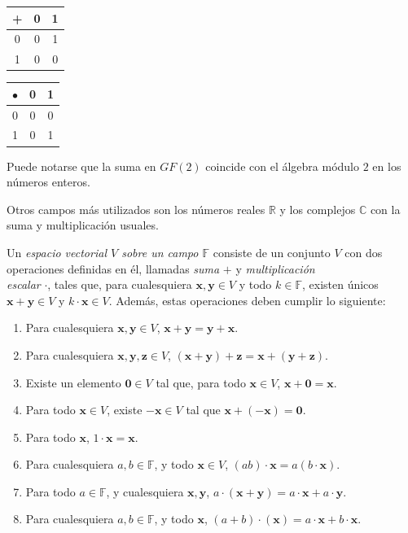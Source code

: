             \begin{center}
                \begin{tabular}{ c | c c }
                    + & 0 & 1 \\ \hline
                    0 & 0 & 1 \\  
                    1 & 0 & 0    
                \end{tabular}
            \end{center}

            \begin{center}
                \begin{tabular}{ c | c c }
                    $\bullet$ & 0 & 1 \\ \hline
                    0 & 0 & 0 \\  
                    1 & 0 & 1    
                \end{tabular}
            \end{center}

            Puede notarse que la suma en $GF(2)$ coincide con el álgebra módulo $2$ en los números enteros.

            Otros campos más utilizados son los números reales $\mathbb{R}$ y los complejos $\mathbb{C}$ con la suma y multiplicación usuales.


            Un \textit{espacio vectorial $V$ sobre un campo $\mathbb{F}$} consiste de un conjunto $V$ con dos operaciones definidas en él, llamadas  \textit{suma} $+$ y \textit{multiplicación \\ escalar} $\cdot$, tales que, para cualesquiera $\mathbf{x,y} \in V$ y todo $k \in \mathbb{F}$, existen únicos $\mathbf{x + y} \in V$ y $k \cdot \mathbf{x} \in V$. Además, estas operaciones deben cumplir lo siguiente:
 
            \begin{enumerate}
                \item Para cualesquiera $\mathbf{x,y} \in V$, $\mathbf{x + y = y + x}$.
                \item Para cualesquiera $\mathbf{x,y,z} \in V$, $\mathbf{(x+y)+z = x+ (y+z)}$.
                \item Existe un elemento $\mathbf{0} \in V$ tal que, para todo $\mathbf{x} \in V$, $\mathbf{x + 0 = x}$.
                \item Para todo $\mathbf{x} \in V$, existe $\mathbf{-x} \in V$ tal que $\mathbf{x + (-x) = 0}$.
                \item Para todo $\mathbf{x}$, $1 \cdot \mathbf{x} = \mathbf{x}$.
                \item Para cualesquiera $a,b \in \mathbb{F}$, y todo $\mathbf{x} \in V$, $(ab)\cdot \mathbf{x} = a(b\cdot\mathbf{x})$.
                \item Para todo $a \in \mathbb{F}$, y cualesquiera $\mathbf{x,y}$, $a \cdot (\mathbf{x + y}) = a\cdot \mathbf{x} + a\cdot \mathbf{y}$.
                \item Para cualesquiera $a,b \in \mathbb{F}$, y todo $\mathbf{x}$, $(a+b) \cdot (\mathbf{x}) = a\cdot \mathbf{x} + b\cdot \mathbf{x}$.
            \end{enumerate}
 
